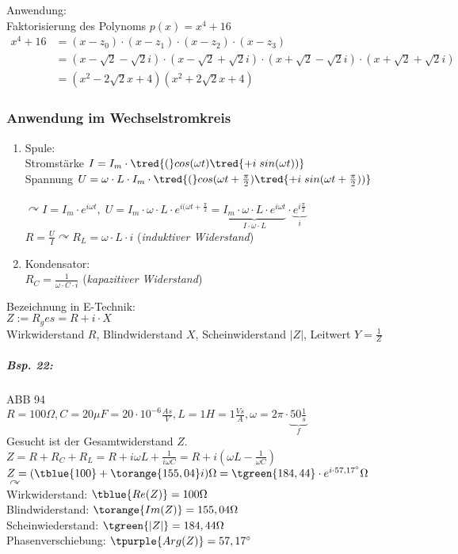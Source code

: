 Anwendung: \\
Faktorisierung des Polynoms $p(x)=x^4+16$
\begin{align*}
x^4+16 &= (x-z_0)\cdot(x-z_1)\cdot(x-z_2)\cdot(x-z_3)\\
&= (x-\sqrt{2}-\sqrt{2}i)\cdot (x-\sqrt{2}+\sqrt{2}i)\cdot (x+\sqrt{2}-\sqrt{2}i) \cdot (x+\sqrt{2}+\sqrt{2}i)\\
&= (x^2-2\sqrt{2}x+4)(x^2+2\sqrt{2}x+4)
\end{align*}

\subsubsection{Anwendung im Wechselstromkreis}
\begin{enumerate}
\item Spule: \\
Stromstärke $I=I_m\cdot \tred{(}cos (\omega t) \tred{+ i \; sin(\omega t))}$\\
Spannung $U=\omega \cdot L\cdot I_m \cdot \tred{(}cos (\omega t +\frac{\pi}{2}) \tred{+ i \; sin(\omega t  +\frac{\pi}{2}))}$\\
\\
$\curvearrowright I=I_m \cdot e^{i\omega t}, \; U=I_m\cdot \omega \cdot L \cdot e^{i(\omega t+\frac{\pi}{2}}=\underbrace{I_m\cdot \omega \cdot L \cdot e^{i\omega t}}_{I\cdot \omega \cdot L}\cdot \underbrace{e^{i\frac{\pi}{2}}}_i$\\
$R=\frac{U}{I}\curvearrowright \boxed{R_L=\omega \cdot L \cdot i}$ (\emph{induktiver Widerstand})
\item Kondensator: \\
$\boxed{R_C=\frac{1}{\omega \cdot C \cdot i}}$ (\emph{kapazitiver Widerstand})
\end{enumerate}
Bezeichnung in E-Technik:\\
$Z:= R_ges = R+i\cdot X$\\
Wirkwiderstand $R$, Blindwiderstand $X$, Scheinwiderstand $|Z|$, Leitwert $Y=\frac{1}{Z}$

\subparagraph{Bsp. 22:} \parskp
ABB 94\\
$R=100 \Omega, C = 20 \mu F=20\cdot 10^{-6}\frac{As}{V}, L=1H=1 \frac{Vs}{A}, \omega = 2\pi \cdot \underbrace{50 \frac{1}{s}}_{f}$\\
Gesucht ist der Gesamtwiderstand $Z$.\\
$Z=R + R_C + R_L = R+i \omega L + \frac{1}{i \omega C}=R+i(\omega L - \frac{1}{\omega C})$\\
$Z=(\tblue{100}+\torange{155,04}i)\Omega = \tgreen{184,44} \cdot e^{i\cdot 57,17^{\circ}}\Omega$\\
$\curvearrowright$ \\
Wirkwiderstand: $\tblue{Re(Z)}=100 \Omega$\\
Blindwiderstand: $\torange{Im(Z)}=155,04 \Omega$\\
Scheinwiederstand: $\tgreen{|Z|}=184,44 \Omega$\\
Phasenverschiebung: $\tpurple{Arg(Z)}=57,17^{\circ}$